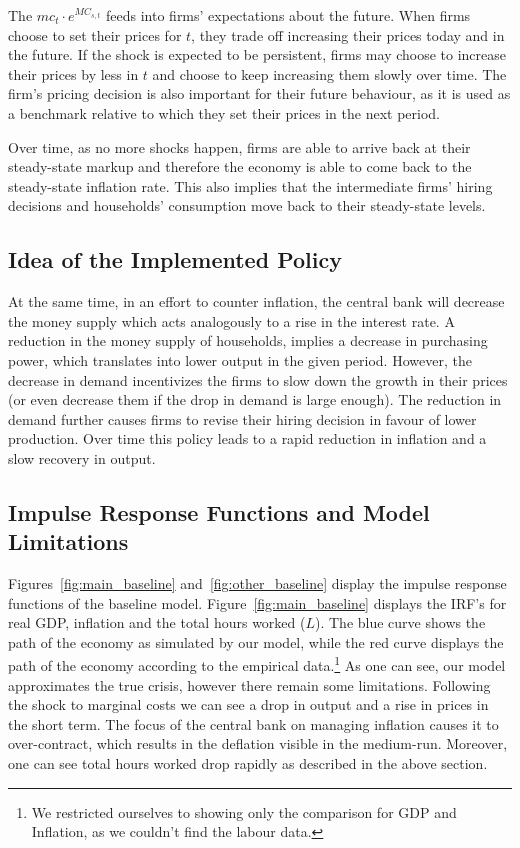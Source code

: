 \documentclass[12pt]{article}
\begin{document}
The $mc_t \cdot e^{MC_{s, t}}$ feeds into firms' expectations about the future. When firms choose to set their prices for $t$, they trade off increasing their prices today and in the future. If the shock is expected to be persistent, firms may choose to increase their prices by less in $t$ and choose to keep increasing them slowly over time. The firm's pricing decision is also important for their future behaviour, as it is used as a benchmark relative to which they set their prices in the next period. 

Over time, as no more shocks happen, firms are able to arrive back at their steady-state markup and therefore the economy is able to come back to the steady-state inflation rate. This also implies that the intermediate firms' hiring decisions and households' consumption move back to their steady-state levels.

\subsection*{Idea of the Implemented Policy}

At the same time, in an effort to counter inflation, the central bank will decrease the money supply which acts analogously to a rise in the interest rate. A reduction in the money supply of households, implies a decrease in purchasing power, which translates into lower output in the given period. However, the decrease in demand incentivizes the firms to slow down the growth in their prices (or even decrease them if the drop in demand is large enough). The reduction in demand further causes firms to revise their hiring decision in favour of lower production. Over time this policy leads to a rapid reduction in inflation and a slow recovery in output.

\subsection*{Impulse Response Functions and Model Limitations}

Figures~\ref{fig:main_baseline} and~\ref{fig:other_baseline} display the impulse response functions of the baseline model. Figure~\ref{fig:main_baseline} displays the IRF's for real GDP, inflation and the total hours worked ($L$). The blue curve shows the path of the economy as simulated by our model, while the red curve displays the path of the economy according to the empirical data.\footnote{We restricted ourselves to showing only the comparison for GDP and Inflation, as we couldn't find the labour data.} As one can see, our model approximates the true crisis, however there remain some limitations. Following the shock to marginal costs we can see a drop in output and a rise in prices in the short term. The focus of the central bank on managing inflation causes it to over-contract, which results in the deflation visible in the medium-run. Moreover, one can see total hours worked drop rapidly as described in the above section. 
\end{document}
